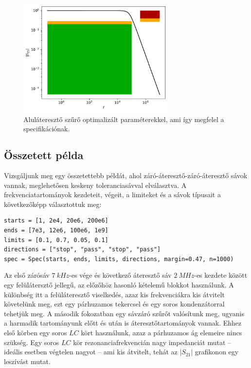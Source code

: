         \begin{figure}[h!]
            \centering
            \includegraphics[width=0.7\textwidth]{alulatereszto_opt.pdf}
            \caption{Aluláteresztő szűrő optimalizált paraméterekkel, ami így megfelel a specifikációnak.}
            \label{fig:alulatereszto_opt}
        \end{figure}
        
	\subsection{Összetett példa}
		Vizsgáljunk meg egy összetettebb példát, ahol záró-áteresztő-záró-áteresztő sávok vannak, meglehetősen keskeny toleranciasávval elválasztva. A frekvenciatartományok kezdeteit, végeit, a limiteket és a sávok típusait a következőképp választottuk meg:
		\begin{lstlisting}
starts = [1, 2e4, 20e6, 200e6]
ends = [7e3, 12e6, 100e6, 1e9]
limits = [0.1, 0.7, 0.05, 0.1]
directions = ["stop", "pass", "stop", "pass"]
spec = Spec(starts, ends, limits, directions, margin=0.47, n=1000)
        \end{lstlisting}		
		Az első zárósáv $\SI{7}{kHz}$-es vége és következő áteresztő sáv $\SI{2}{MHz}$-es kezdete között egy felülátersztő jellegű, az előzőhöz hasonló kételemű blokkot használunk. A különbség itt a felüláteresztő viselkedés, azaz kis frekvenciákra kis átvitelt követelünk meg, ezt egy párhuzamos tekercsel és egy soros kondenzátorral tehetjük meg. A második fokozatban egy sávzáró szűrőt valósítunk meg, ugyanis a harmadik tartományunk előtt és után is áteresztőtartományok vannak. Ehhez első körben egy soros $LC$ kört használunk, azaz a párhuzamos ág elemeire nincs szükség. Egy soros $LC$ kör rezonanciafrekvencián nagy impedanciát mutat -- ideális esetben végtelen nagyot -- ami kis átvitelt, tehát az $|S_{21}|$ grafikonon egy leszívást mutat.

